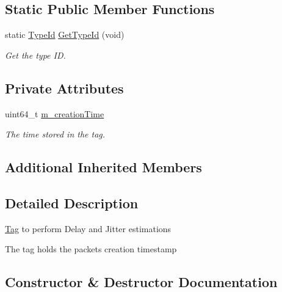 \subsection*{Static Public Member Functions}
\begin{DoxyCompactItemize}
\item 
static \hyperlink{classns3_1_1TypeId}{Type\+Id} \hyperlink{classns3_1_1DelayJitterEstimationTimestampTag_a274334ddbccb4170e2f81eb867d42233}{Get\+Type\+Id} (void)
\begin{DoxyCompactList}\small\item\em Get the type ID. \end{DoxyCompactList}\end{DoxyCompactItemize}
\subsection*{Private Attributes}
\begin{DoxyCompactItemize}
\item 
uint64\+\_\+t \hyperlink{classns3_1_1DelayJitterEstimationTimestampTag_ad1a32c69c3083d54a7d81595b826da0c}{m\+\_\+creation\+Time}
\begin{DoxyCompactList}\small\item\em The time stored in the tag. \end{DoxyCompactList}\end{DoxyCompactItemize}
\subsection*{Additional Inherited Members}


\subsection{Detailed Description}
\hyperlink{classns3_1_1Tag}{Tag} to perform Delay and Jitter estimations

The tag holds the packet\textquotesingle{}s creation timestamp 

\subsection{Constructor \& Destructor Documentation}
